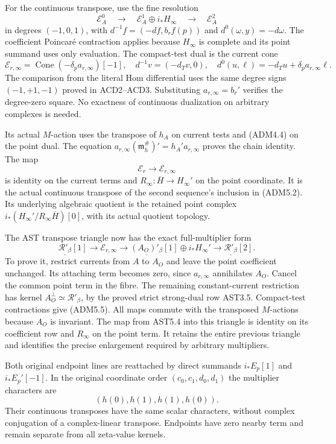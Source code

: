 For the continuous transpose, use the fine resolution \[
\mathscr E_A^0\quad\longrightarrow\quad
\mathscr E_A^1\oplus i_*H_\infty\quad\longrightarrow\quad
\mathscr E_A^2
\] in degrees \((-1,0,1)\), with \(d^{-1}f=(-df,b_rf(p))\) and
\(d^0(\omega,y)=-d\omega\). The coefficient Poincaré contraction applies
because \(H_\infty\) is complete and its point summand uses only
evaluation. The compact-test dual is the current cone \[
\mathscr E_{r,\infty}
=\operatorname{Cone}(-\delta_pa_{r,\infty})[-1],
\quad
d^{-1}v=(-d_Tv,0),\quad
d^0(u,\ell)=-d_Tu+\delta_pa_{r,\infty}\ell.
\tag{ADM5.4}
\] The comparison from the literal Hom differential uses the same degree
signs \((-1,+1,-1)\) proved in ACD2--ACD3. Substituting
\(a_{r,\infty}=b_r'\) verifies the degree-zero square. No exactness of
continuous dualization on arbitrary complexes is needed.

Its actual \(M\)-action uses the transpose of \(h_A\) on current tests
and (ADM4.4) on the point dual. The equation
\(a_{r,\infty}(\mathfrak m_h^\#)'=h_A'a_{r,\infty}\) proves the chain
identity. The map \[
\mathscr E_r\to\mathscr E_{r,\infty}
\] is identity on the current terms and
\(R_\infty:\overline H\to H_\infty'\) on the point coordinate. It is the
actual continuous transpose of the second sequence's inclusion in
(ADM5.2). Its underlying algebraic quotient is the retained point
complex \(i_*(H_\infty'/R_\infty\overline H)[0]\), with its actual
quotient topology.

The AST transpose triangle now has the exact full-multiplier form \[
\underline{\mathcal R'_\beta}[1]\to\mathscr E_{r,\infty}
\to\underline{(A_O)'_\beta}[1]\oplus i_*H_\infty'
\to\underline{\mathcal R'_\beta}[2].
\tag{ADM5.5}
\] To prove it, restrict currents from \(A\) to \(A_O\) and leave the
point coefficient unchanged. Its attaching term becomes zero, since
\(a_{r,\infty}\) annihilates \(A_O\). Cancel the common point term in
the fibre. The remaining constant-current restriction has kernel
\(A_O^\perp\simeq\mathcal R'_\beta\), by the proved strict strong-dual
row AST3.5. Compact-test contractions give (ADM5.5). All maps commute
with the transposed \(M\)-actions because \(A_O\) is invariant. The map
from AST5.4 into this triangle is identity on its coefficient row and
\(R_\infty\) on the point term. It retains the entire previous triangle
and identifies the precise enlargement required by arbitrary
multipliers.

Both original endpoint lines are reattached by direct summands
\(i_*E_p[1]\) and \(i_*E_p'[-1]\). In the original coordinate order
\((c_0,c_1,d_0,d_1)\) the multiplier characters are \[
(h(0),h(1),h(1),h(0)).
\tag{ADM5.6}
\] Their continuous transposes have the same scalar characters, without
complex conjugation of a complex-linear transpose. Endpoints have zero
nearby term and remain separate from all zeta-value kernels.

